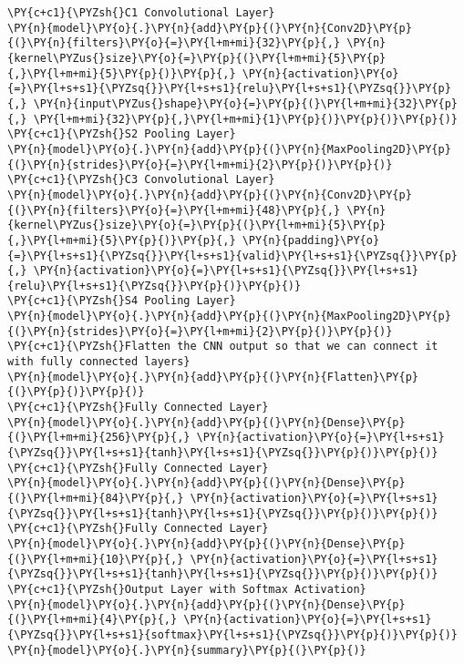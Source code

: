 \begin{tcolorbox}[breakable, size=fbox, boxrule=1pt, pad at break*=1mm,colback=cellbackground, colframe=cellborder]
\begin{Verbatim}[commandchars=\\\{\}]
\PY{c+c1}{\PYZsh{}C1 Convolutional Layer}
\PY{n}{model}\PY{o}{.}\PY{n}{add}\PY{p}{(}\PY{n}{Conv2D}\PY{p}{(}\PY{n}{filters}\PY{o}{=}\PY{l+m+mi}{32}\PY{p}{,} \PY{n}{kernel\PYZus{}size}\PY{o}{=}\PY{p}{(}\PY{l+m+mi}{5}\PY{p}{,}\PY{l+m+mi}{5}\PY{p}{)}\PY{p}{,} \PY{n}{activation}\PY{o}{=}\PY{l+s+s1}{\PYZsq{}}\PY{l+s+s1}{relu}\PY{l+s+s1}{\PYZsq{}}\PY{p}{,} \PY{n}{input\PYZus{}shape}\PY{o}{=}\PY{p}{(}\PY{l+m+mi}{32}\PY{p}{,} \PY{l+m+mi}{32}\PY{p}{,}\PY{l+m+mi}{1}\PY{p}{)}\PY{p}{)}\PY{p}{)}
\PY{c+c1}{\PYZsh{}S2 Pooling Layer}
\PY{n}{model}\PY{o}{.}\PY{n}{add}\PY{p}{(}\PY{n}{MaxPooling2D}\PY{p}{(}\PY{n}{strides}\PY{o}{=}\PY{l+m+mi}{2}\PY{p}{)}\PY{p}{)}
\PY{c+c1}{\PYZsh{}C3 Convolutional Layer}
\PY{n}{model}\PY{o}{.}\PY{n}{add}\PY{p}{(}\PY{n}{Conv2D}\PY{p}{(}\PY{n}{filters}\PY{o}{=}\PY{l+m+mi}{48}\PY{p}{,} \PY{n}{kernel\PYZus{}size}\PY{o}{=}\PY{p}{(}\PY{l+m+mi}{5}\PY{p}{,}\PY{l+m+mi}{5}\PY{p}{)}\PY{p}{,} \PY{n}{padding}\PY{o}{=}\PY{l+s+s1}{\PYZsq{}}\PY{l+s+s1}{valid}\PY{l+s+s1}{\PYZsq{}}\PY{p}{,} \PY{n}{activation}\PY{o}{=}\PY{l+s+s1}{\PYZsq{}}\PY{l+s+s1}{relu}\PY{l+s+s1}{\PYZsq{}}\PY{p}{)}\PY{p}{)}
\PY{c+c1}{\PYZsh{}S4 Pooling Layer}
\PY{n}{model}\PY{o}{.}\PY{n}{add}\PY{p}{(}\PY{n}{MaxPooling2D}\PY{p}{(}\PY{n}{strides}\PY{o}{=}\PY{l+m+mi}{2}\PY{p}{)}\PY{p}{)}
\PY{c+c1}{\PYZsh{}Flatten the CNN output so that we can connect it with fully connected layers}
\PY{n}{model}\PY{o}{.}\PY{n}{add}\PY{p}{(}\PY{n}{Flatten}\PY{p}{(}\PY{p}{)}\PY{p}{)}
\PY{c+c1}{\PYZsh{}Fully Connected Layer}
\PY{n}{model}\PY{o}{.}\PY{n}{add}\PY{p}{(}\PY{n}{Dense}\PY{p}{(}\PY{l+m+mi}{256}\PY{p}{,} \PY{n}{activation}\PY{o}{=}\PY{l+s+s1}{\PYZsq{}}\PY{l+s+s1}{tanh}\PY{l+s+s1}{\PYZsq{}}\PY{p}{)}\PY{p}{)}
\PY{c+c1}{\PYZsh{}Fully Connected Layer}
\PY{n}{model}\PY{o}{.}\PY{n}{add}\PY{p}{(}\PY{n}{Dense}\PY{p}{(}\PY{l+m+mi}{84}\PY{p}{,} \PY{n}{activation}\PY{o}{=}\PY{l+s+s1}{\PYZsq{}}\PY{l+s+s1}{tanh}\PY{l+s+s1}{\PYZsq{}}\PY{p}{)}\PY{p}{)}
\PY{c+c1}{\PYZsh{}Fully Connected Layer}
\PY{n}{model}\PY{o}{.}\PY{n}{add}\PY{p}{(}\PY{n}{Dense}\PY{p}{(}\PY{l+m+mi}{10}\PY{p}{,} \PY{n}{activation}\PY{o}{=}\PY{l+s+s1}{\PYZsq{}}\PY{l+s+s1}{tanh}\PY{l+s+s1}{\PYZsq{}}\PY{p}{)}\PY{p}{)}
\PY{c+c1}{\PYZsh{}Output Layer with Softmax Activation}
\PY{n}{model}\PY{o}{.}\PY{n}{add}\PY{p}{(}\PY{n}{Dense}\PY{p}{(}\PY{l+m+mi}{4}\PY{p}{,} \PY{n}{activation}\PY{o}{=}\PY{l+s+s1}{\PYZsq{}}\PY{l+s+s1}{softmax}\PY{l+s+s1}{\PYZsq{}}\PY{p}{)}\PY{p}{)}
\PY{n}{model}\PY{o}{.}\PY{n}{summary}\PY{p}{(}\PY{p}{)}
\end{Verbatim}
\end{tcolorbox}

